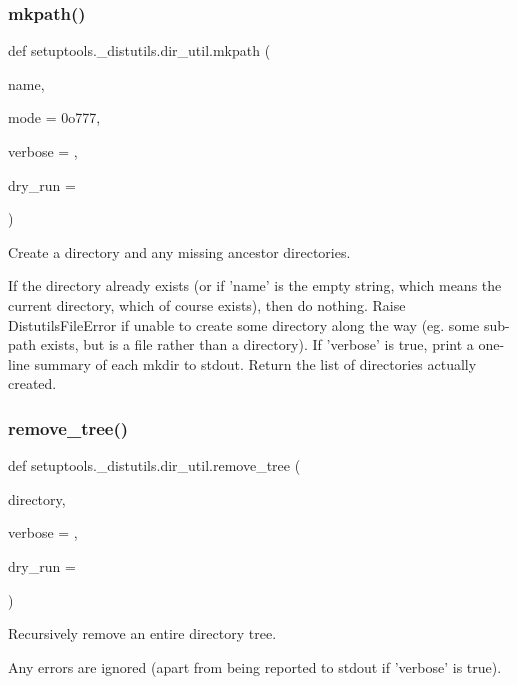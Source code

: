 \subsubsection{\texorpdfstring{mkpath()}{mkpath()}}
{\footnotesize\ttfamily def setuptools.\+\_\+distutils.\+dir\+\_\+util.\+mkpath (\begin{DoxyParamCaption}\item[{}]{name,  }\item[{}]{mode = {\ttfamily 0o777},  }\item[{}]{verbose = {},  }\item[{}]{dry\+\_\+run = {} }\end{DoxyParamCaption})}

\begin{DoxyVerb}Create a directory and any missing ancestor directories.

If the directory already exists (or if 'name' is the empty string, which
means the current directory, which of course exists), then do nothing.
Raise DistutilsFileError if unable to create some directory along the way
(eg. some sub-path exists, but is a file rather than a directory).
If 'verbose' is true, print a one-line summary of each mkdir to stdout.
Return the list of directories actually created.
\end{DoxyVerb}
 \mbox{\label{namespacesetuptools_1_1__distutils_1_1dir__util_a7e2284b026c6cb8672e5e07174bbd5fe}} 
\subsubsection{\texorpdfstring{remove\+\_\+tree()}{remove\_tree()}}
{\footnotesize\ttfamily def setuptools.\+\_\+distutils.\+dir\+\_\+util.\+remove\+\_\+tree (\begin{DoxyParamCaption}\item[{}]{directory,  }\item[{}]{verbose = {},  }\item[{}]{dry\+\_\+run = {} }\end{DoxyParamCaption})}

\begin{DoxyVerb}Recursively remove an entire directory tree.

Any errors are ignored (apart from being reported to stdout if 'verbose'
is true).
\end{DoxyVerb}
 